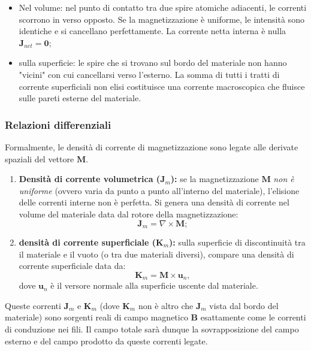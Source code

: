 \documentclass[a4paper,11pt]{report}
\begin{document}
\begin{itemize}
    \item {Nel volume:} nel punto di contatto tra due spire atomiche adiacenti, le correnti scorrono in verso opposto. Se la magnetizzazione è uniforme, le intensità sono identiche e si cancellano perfettamente. La corrente netta interna è nulla $\bm{J}_{net} = \bm{0}$;
    \item {sulla superficie:} le spire che si trovano sul bordo del materiale non hanno "vicini" con cui cancellarsi verso l'esterno. La somma di tutti i tratti di corrente superficiali non elisi costituisce una corrente macroscopica che fluisce sulle pareti esterne del materiale.
\end{itemize}

\subsubsection{Relazioni differenziali}
Formalmente, le densità di corrente di magnetizzazione sono legate alle derivate spaziali del vettore $\bm{M}$.

\begin{enumerate}
    \item \textbf{Densità di corrente volumetrica ($\bm{J}_m$):}
    se la magnetizzazione $\bm{M}$ \textit{non è uniforme} (ovvero varia da punto a punto all'interno del materiale), l'elisione delle correnti interne non è perfetta. Si genera una densità di corrente nel volume del materiale data dal rotore della magnetizzazione:
    \begin{equation}
        \bm{J}_m = \nabla \times \bm{M};
        \label{eq:J_mag}
    \end{equation}

    \item \textbf{densità di corrente superficiale ($\bm{K}_m$):}
    sulla superficie di discontinuità tra il materiale e il vuoto (o tra due materiali diversi), compare una densità di corrente superficiale data da:
    \begin{equation}
        \bm{K}_m = \bm{M} \times \bm{u}_n,
        \label{eq:K_mag}
    \end{equation}
    dove $\bm{u}_n$ è il versore normale alla superficie uscente dal materiale.
\end{enumerate}
Queste correnti $\bm{J}_m$ e $\bm{K}_m$ (dove  $\bm{K}_m$ non è altro che $\bm{J}_m$ vista dal bordo del materiale) sono sorgenti reali di campo magnetico $\bm{B}$ esattamente come le correnti di conduzione nei fili. Il campo totale sarà dunque la sovrapposizione del campo esterno e del campo prodotto da queste correnti legate.
\end{document}
